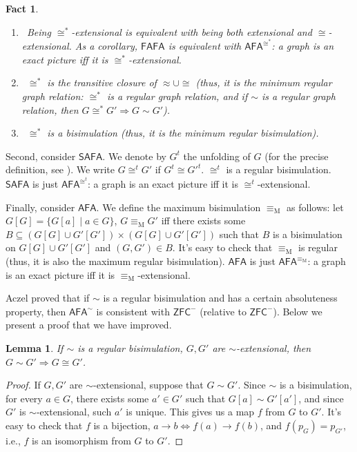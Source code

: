 \documentclass{amsart}
\newcommand{\ZFC}{\mathsf{ZFC}}
\newcommand{\FAFA}{\mathsf{FAFA}}
\newcommand{\SAFA}{\mathsf{SAFA}}
\newcommand{\AFA}{\mathsf{AFA}}
\newtheorem{lemma}{Lemma}
\newtheorem{fact}{Fact}
\begin{document}
\begin{fact} \mbox{}

\begin{enumerate}[label=(\arabic*)]
    \item\ Being $\cong^*$-extensional is equivalent with being both extensional and $\cong$-extensional. As a corollary, $\FAFA$ is equivalent with $\AFA^{\cong^*}$: a graph is an exact picture iff it is $\cong^*$-extensional.
    \item\ $\cong^*$ is the transitive closure of $\approx \cup \cong$ (thus, it is the minimum regular graph relation: $\cong^*$ is a regular graph relation, and if $\sim$ is a regular graph relation, then $G\cong^* G'\Rightarrow G\sim G'$).
    \item\ $\cong^*$ is a bisimulation (thus, it is the minimum regular bisimulation).
\end{enumerate}
\end{fact}

Second, consider $\SAFA$. We denote by $G^t$ the unfolding of $G$ (for the precise definition, see \cite{Aczel}). We write $G \cong^t G'$ if $G^t \cong {G'}^t$. $\cong^t$ is a regular bisimulation. $\SAFA$ is just $\AFA^{\cong^t}$: a graph is an exact picture iff it is $\cong^t$-extensional.

Finally, consider $\AFA$. 
We define the maximum bisimulation $\equiv_\mathrm{M}$ as follows: let $G[G]=\{G[a]\mid a\in G\}$, $G\equiv_\mathrm{M} G'$ iff there exists some $B\subseteq (G[G]\cup G'[G'])\times(G[G]\cup G'[G'])$ such that $B$ is a bisimulation on $G[G]\cup G'[G']$ and $(G,G')\in B$. It's easy to check that $\equiv_\mathrm{M}$ is regular (thus, it is also the maximum regular bisimulation). $\AFA$ is just $\AFA^{\equiv_\text{M}}$: a graph is an exact picture iff it is $\equiv_\text{M}$-extensional.

Aczel proved that if $\sim$ is a regular bisimulation and has a certain absoluteness property, then $\AFA^\sim$ is consistent with $\ZFC^{-}$ (relative to $\ZFC^{-}$).\cite{Aczel} Below we present a proof that we have improved.

\begin{lemma}
    If $\sim$ is a regular bisimulation, $G,G'$ are $\sim$-extensional, then $G\sim G'\Rightarrow G\cong G'$.
\end{lemma}
\begin{proof}
    If $G,G'$ are $\sim$-extensional, suppose that $G\sim G'$.
    Since $\sim$ is a bisimulation, for every $a\in G$, there exists some $a'\in G'$ such that $G[a]\sim G'[a']$, and since $G'$ is $\sim$-extensional, such $a'$ is unique.
    This gives us a map $f$ from $G$ to $G'$.
    It's easy to check that $f$ is a bijection, $a\to b\Leftrightarrow f(a)\to f(b)$, and $f(p_G)=p_{G'}$, i.e., $f$ is an isomorphism from $G$ to $G'$.
\end{proof}
\end{document}
